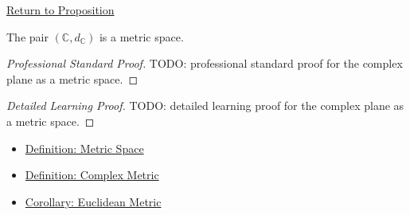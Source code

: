 \newpage
{}
\label{prf:complex-plane-metric-space}

\begin{remark*}[Return]
\hyperref[prop:complex-plane-metric-space]{Return to Proposition}
\end{remark*}

\begin{proposition*}
The pair \((\mathbb{C},d_{\mathbb{C}})\) is a metric space.
\end{proposition*}

\begin{proof}[Professional Standard Proof]
\LRAProofBodyStart
TODO: professional standard proof for the complex plane as a metric space.
\end{proof}

\begin{proof}[Detailed Learning Proof]
\LRAProofBodyStart
TODO: detailed learning proof for the complex plane as a metric space.
\end{proof}

\begin{remark*}
\end{remark*}

\begin{dependencies}
\begin{itemize}
  \item \hyperref[def:metric-space]{Definition: Metric Space}
  \item \hyperref[def:complex-metric]{Definition: Complex Metric}
  \item \hyperref[cor:euclidean-metric]{Corollary: Euclidean Metric}
\end{itemize}
\end{dependencies}

\clearpage
